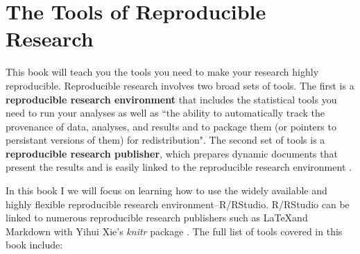 
\section{The Tools of Reproducible Research}

This book will teach you the tools you need to make your research highly reproducible. Reproducible research involves two broad sets of tools. The first is a {\bf{reproducible research environment}} that includes the statistical tools you need to run your analyses as well as ``the ability to automatically track the provenance of data, analyses, and results and to package them (or pointers to persistant versions of them) for redistribution". The second set of tools is a {\bf{reproducible research publisher}}, which prepares dynamic documents that present the results and is easily linked to the reproducible research environment \cite[]{Mesirov2010}.

In this book I we will focus on learning how to use the widely available and highly flexible reproducible research environment--R/RStudio. R/RStudio can be linked to numerous reproducible research publishers such as \LaTeX and Markdown with Yihui Xie's {\emph{knitr}} package \citeyearpar{knitr}. The full list of tools covered in this book include:

